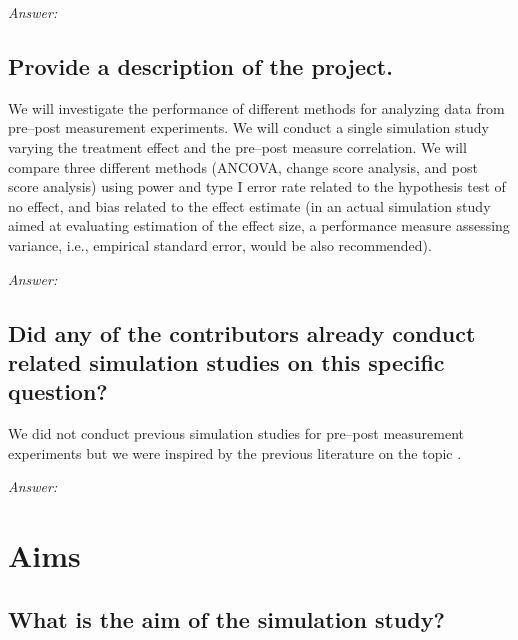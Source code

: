 \documentclass[12pt]{article}
\begin{document}
\textit{Answer:}

\subsection{Provide a description of the project.}


\begin{examplebox}
    We will investigate the performance of different methods for analyzing data from pre--post measurement experiments. We will conduct a single simulation study varying the treatment effect and the pre--post measure correlation. We will compare three different methods (ANCOVA, change score analysis, and post score analysis) using power and type I error rate related to the hypothesis test of no effect, and bias related to the effect estimate (in an actual simulation study aimed at evaluating estimation of the effect size, a performance measure assessing variance, i.e., empirical standard error, would be also recommended).  
\end{examplebox}

\textit{Answer:}

\subsection{Did any of the contributors already conduct related simulation studies on this specific question?}


\begin{examplebox}
    We did not conduct previous simulation studies for pre--post measurement experiments but we were inspired by the previous literature on the topic \parencite{vickers2001use, senn2006change, van2013ancova, clifton2019correlation, ludtke2023ancova}.
\end{examplebox}

\textit{Answer:}

\section{Aims}
\subsection{What is the aim of the simulation study?}
 
\end{document}
